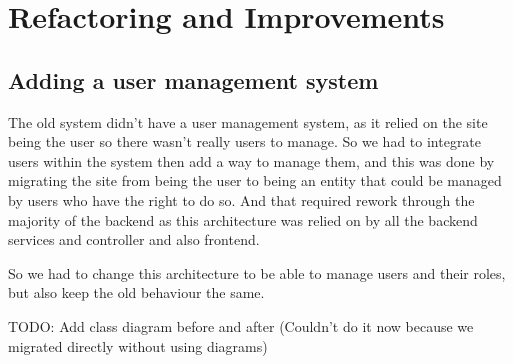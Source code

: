 \section {Refactoring and Improvements}

\subsection {Adding a user management system}

The old system didn't have a user management system, as it relied on the site being the
user so there wasn't really users to manage. So we had to integrate users within the system
then add a way to manage them, and this was done by migrating the site from being the user
to being an entity that could be managed by users who have the right to do so.
And that required rework through the majority of the backend as this architecture was
relied on by all the backend services and controller and also frontend.

So we had to change this architecture to be able to manage users and their roles, but also
keep the old behaviour the same.

TODO: Add class diagram before and after (Couldn't do it now because we migrated directly without using diagrams)
